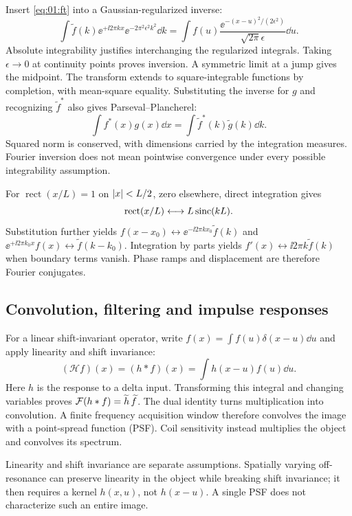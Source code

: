 Insert \cref{eq:01:ft} into a Gaussian-regularized inverse:
\[
 \int\widetilde f(k)\ee^{+\ii2\pi kx}
        \ee^{-2\pi^2\epsilon^2k^2}\dd k
 =\int f(u)\frac{\ee^{-(x-u)^2/(2\epsilon^2)}}{\sqrt{2\pi}\epsilon}\dd u .
\]
Absolute integrability justifies interchanging the regularized integrals.
Taking $\epsilon\to0$ at continuity points proves inversion.
A symmetric limit at a jump gives the midpoint. The transform extends
to square-integrable functions by completion, with mean-square equality.
Substituting the inverse for $g$ and recognizing $\widetilde f^*$
also gives Parseval--Plancherel:
\begin{equation}
 \int f^*(x)g(x)\dd x=\int\widetilde f^*(k)\widetilde g(k)\dd k .
 \label{eq:01:parseval}
\end{equation}
Squared norm is conserved, with dimensions carried by the integration
measures. Fourier inversion does not mean pointwise convergence under
every possible integrability assumption.

For $\operatorname{rect}(x/L)=1$ on $\lvert x\rvert<L/2$, zero elsewhere,
direct integration gives
\begin{equation}
 \operatorname{rect}(x/L)\longleftrightarrow L\operatorname{sinc}(kL).
 \label{eq:01:rect}
\end{equation}
Substitution further yields
$f(x-x_0)\leftrightarrow\ee^{-\ii2\pi kx_0}\widetilde f(k)$ and
$\ee^{+\ii2\pi k_0x}f(x)\leftrightarrow\widetilde f(k-k_0)$.
Integration by parts yields
$f'(x)\leftrightarrow\ii2\pi k\widetilde f(k)$ when boundary terms vanish.
Phase ramps and displacement are therefore Fourier conjugates.

\subsection{Convolution, filtering and impulse responses}
For a linear shift-invariant operator, write
$f(x)=\int f(u)\delta(x-u)\dd u$ and apply linearity and shift invariance:
\[
 (\mathcal H f)(x)=(h*f)(x)=\int h(x-u)f(u)\dd u .
\]
Here $h$ is the response to a delta input. Transforming this integral
and changing variables proves $\mathcal{F}(h*f)=\widetilde h\,\widetilde f$.
The dual identity turns multiplication into convolution.
A finite frequency acquisition window therefore convolves the image
with a point-spread function (PSF). Coil sensitivity instead multiplies
the object and convolves its spectrum.

Linearity and shift invariance are separate assumptions.
Spatially varying off-resonance can preserve linearity in the object
while breaking shift invariance; it then requires a kernel $h(x,u)$,
not $h(x-u)$. A single PSF does not characterize such an entire image.

